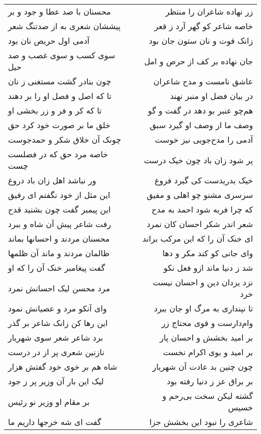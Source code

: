 \begin{center}
\begin{longtable}{l p{0.5cm} r}
محسنان با صد عطا و جود و بر
&&
زر نهاده شاعران را منتظر
\\
پیششان شعری به از صدتنگ شعر
&&
خاصه شاعر کو گهر آرد ز قعر
\\
آدمی اول حریص نان بود
&&
زانک قوت و نان ستون جان بود
\\
سوی کسب و سوی غصب و صد حیل
&&
جان نهاده بر کف از حرص و امل
\\
چون بنادر گشت مستغنی ز نان
&&
عاشق نامست و مدح شاعران
\\
تا که اصل و فصل او را بر دهند
&&
در بیان فضل او منبر نهند
\\
تا که کر و فر و زر بخشی او
&&
هم‌چو عنبر بو دهد در گفت و گو
\\
خلق ما بر صورت خود کرد حق
&&
وصف ما از وصف او گیرد سبق
\\
چونک آن خلاق شکر و حمدجوست
&&
آدمی را مدح‌جویی نیز خوست
\\
خاصه مرد حق که در فضلست چست
&&
پر شود زان باد چون خیک درست
\\
ور نباشد اهل زان باد دروغ
&&
خیک بدریدست کی گیرد فروغ
\\
این مثل از خود نگفتم ای رفیق
&&
سرسری مشنو چو اهلی و مفیق
\\
این پیمبر گفت چون بشنید قدح
&&
که چرا فربه شود احمد به مدح
\\
رفت شاعر پیش آن شاه و ببرد
&&
شعر اندر شکر احسان کان نمرد
\\
محسنان مردند و احسانها بماند
&&
ای خنک آن را که این مرکب براند
\\
ظالمان مردند و ماند آن ظلمها
&&
وای جانی کو کند مکر و دها
\\
گفت پیغامبر خنک آن را که او
&&
شد ز دنیا ماند ازو فعل نکو
\\
مرد محسن لیک احسانش نمرد
&&
نزد یزدان دین و احسان نیست خرد
\\
وای آنکو مرد و عصیانش نمود
&&
تا نپنداری به مرگ او جان ببرد
\\
این رها کن زانک شاعر بر گذر
&&
وام‌دارست و قوی محتاج زر
\\
برد شاعر شعر سوی شهریار
&&
بر امید بخشش و احسان پار
\\
نازنین شعری پر از در درست
&&
بر امید و بوی اکرام نخست
\\
شاه هم بر خوی خود گفتش هزار
&&
چون چنین بد عادت آن شهریار
\\
لیک این بار آن وزیر پر ز جود
&&
بر براق عز ز دنیا رفته بود
\\
بر مقام او وزیر نو رئیس
&&
گشته لیکن سخت بی‌رحم و خسیس
\\
گفت ای شه خرجها داریم ما
&&
شاعری را نبود این بخشش جزا
\\

\end{longtable}
\end{center}
